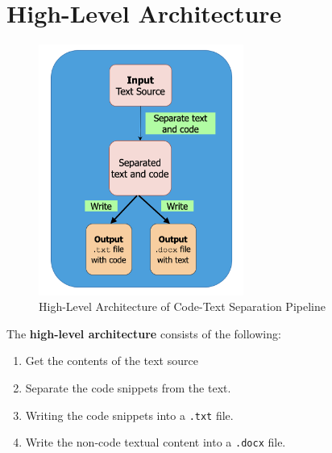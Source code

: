 \documentclass[12pt]{scrreprt}
\begin{document}
\section{High-Level Architecture}

\begin{figure}[h]
    \centering
    \includegraphics[width=0.6\textwidth]{figures/NB-high-arch.png}
    \caption{High-Level Architecture of Code-Text Separation Pipeline}
    \label{fig:high-level-arch}
\end{figure}


The \textbf{high-level architecture} consists of the following:
\begin{enumerate}
    \item Get the contents of the text source
    \item Separate the code snippets from the text.
    \item Writing the code snippets into a \texttt{.txt} file.
    \item Write the non-code textual content into a \texttt{.docx} file.
\end{enumerate}
\end{document}
